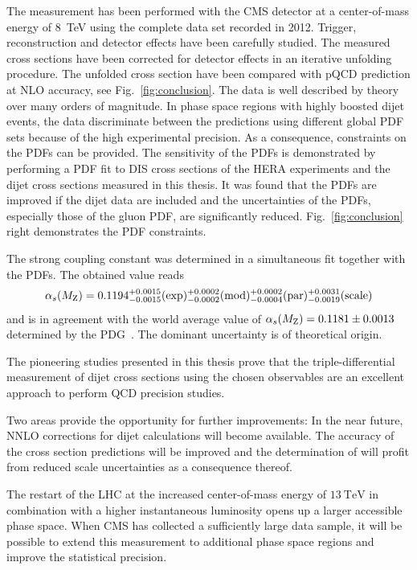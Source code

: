 The measurement has been performed with the CMS detector at a center-of-mass
energy of \SI{8}{\TeV} using the complete data set recorded in 2012. Trigger,
reconstruction and detector effects have been carefully studied. The measured
cross sections have been corrected for detector effects in an iterative
unfolding procedure. The unfolded cross section have been compared with
pQCD prediction at NLO accuracy, see Fig.~\ref{fig:conclusion}. The data
is well described by theory over many orders of magnitude. In phase space
regions with highly boosted dijet events, the data discriminate between the
predictions using different global PDF sets because of the high experimental
precision. As a consequence, constraints on the PDFs can be provided. The
sensitivity of the PDFs is demonstrated by performing a PDF fit to DIS cross
sections of the HERA experiments and the dijet cross sections measured in this
thesis. It was found that the PDFs are improved if the dijet data are included
and the uncertainties of the PDFs, especially those of the gluon PDF, are
significantly reduced. Fig.~\ref{fig:conclusion} right demonstrates the PDF
constraints.

The strong coupling constant \asmz was determined in a simultaneous
fit together with the PDFs. The obtained value reads
%
\begin{equation*}
  \alpha_{s}(M_\mathrm{Z}) = 0.1194_{-0.0015}^{+0.0015}(\mathrm{exp})_{-0.0002}^{+0.0002}(\mathrm{mod})_{-0.0004}^{+0.0002}(\mathrm{par})_{-0.0019}^{+0.0031}(\mathrm{scale})
\end{equation*}
%
and is in agreement with the world average value of $\alpha_{s}(M_\mathrm{Z}) = 0.1181 \pm
0.0013$ determined by the PDG~\cite{Agashe:2014kda}. The dominant uncertainty is
of theoretical origin.

The pioneering studies presented in this thesis prove that the triple-differential
measurement of dijet cross sections using the chosen observables are an
excellent approach to perform QCD precision studies.

Two areas provide the opportunity for further improvements: In the near future,
NNLO corrections for dijet calculations will become available. The accuracy of the
cross section predictions will be improved and the determination of
\asmz will profit from reduced scale uncertainties as a consequence thereof. 

The restart of the LHC at the increased center-of-mass energy of $\SI{13}{\TeV}$
in combination with a higher instantaneous luminosity opens up a larger
accessible phase space. When CMS has collected a sufficiently large data sample,
it will be possible to extend this measurement to additional phase space regions
and improve the statistical precision.

